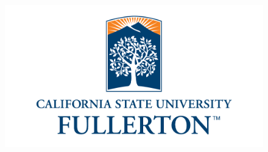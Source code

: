 \documentclass{beamer}
\begin{document}
\begin{frame}
{\begin{figure}
\hspace*{-.2in}
\includegraphics[width=0.8\linewidth]{CSUFlogo.png}
\end{figure}}

\end{frame}


	
\end{document}
